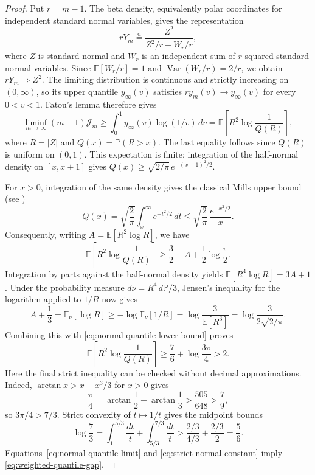 \begin{proof}
Put $r=m-1$. The beta density, equivalently polar coordinates for
independent standard normal variables, gives the representation
\[
 rY_m\overset{\mathrm d}=\frac{Z^2}{Z^2/r+W_r/r},
\]
where $Z$ is standard normal and $W_r$ is an independent sum of $r$
squared standard normal variables. Since
$\mathbb E[W_r/r]=1$ and $\operatorname{Var}(W_r/r)=2/r$,
we obtain $rY_m\Rightarrow Z^2$.
The limiting distribution is continuous and strictly increasing on
$(0,\infty)$, so its upper quantile $y_\infty(v)$ satisfies
$r y_m(v)\to y_\infty(v)$ for every $0<v<1$.
Fatou's lemma therefore gives
\begin{equation}\label{eq:normal-quantile-limit}
 \liminf_{m\to\infty}(m-1)\mathcal J_m
 \ge \int_0^1 y_\infty(v)\log(1/v)\,dv
 =\mathbb E\left[R^2\log\frac{1}{Q(R)}\right],
\end{equation}
where $R=|Z|$ and $Q(x)=\mathbb P(R>x)$.
The last equality follows since $Q(R)$ is uniform on $(0,1)$.
This expectation is finite: integration of the half-normal density on
$[x,x+1]$ gives
$Q(x)\ge\sqrt{2/\pi}\,e^{-(x+1)^2/2}$.

For $x>0$, integration of the same density gives the classical Mills
upper bound (see \cite[Section~4, p.~113]{Lee1992})
\[
 Q(x)=\sqrt{\frac2\pi}\int_x^\infty e^{-t^2/2}\,dt
 \le\sqrt{\frac2\pi}\,\frac{e^{-x^2/2}}{x}.
\]
Consequently, writing $A=\mathbb E[R^2\log R]$, we have
\begin{equation}\label{eq:normal-quantile-lower-bound}
 \mathbb E\left[R^2\log\frac1{Q(R)}\right]
 \ge\frac32+A+\frac12\log\frac\pi2.
\end{equation}
Integration by parts against the half-normal density yields
$\mathbb E[R^4\log R]=3A+1$.
Under the probability measure $d\nu=R^4\,d\mathbb P/3$, Jensen's
inequality for the logarithm applied to $1/R$ now gives
\[
 A+\frac13=\mathbb E_\nu[\log R]
 \ge-\log\mathbb E_\nu[1/R]
 =\log\frac3{\mathbb E[R^3]}
 =\log\frac3{2\sqrt{2/\pi}}.
\]
Combining this with \eqref{eq:normal-quantile-lower-bound} proves
\begin{equation}\label{eq:strict-normal-constant}
 \mathbb E\left[R^2\log\frac1{Q(R)}\right]
 \ge\frac76+\log\frac{3\pi}{4}>2.
\end{equation}
Here the final strict inequality can be checked without decimal
approximations. Indeed, $\arctan x>x-x^3/3$ for $x>0$ gives
\[
 \frac\pi4=\arctan\frac12+\arctan\frac13
 >\frac{505}{648}>\frac79,
\]
so $3\pi/4>7/3$. Strict convexity of $t\mapsto1/t$ gives the
midpoint bounds
\[
 \log\frac73
 =\int_1^{5/3}\frac{dt}{t}+\int_{5/3}^{7/3}\frac{dt}{t}
 >\frac{2/3}{4/3}+\frac{2/3}{2}=\frac56.
\]
Equations~\eqref{eq:normal-quantile-limit} and
\eqref{eq:strict-normal-constant} imply \eqref{eq:weighted-quantile-gap}.
\end{proof}

